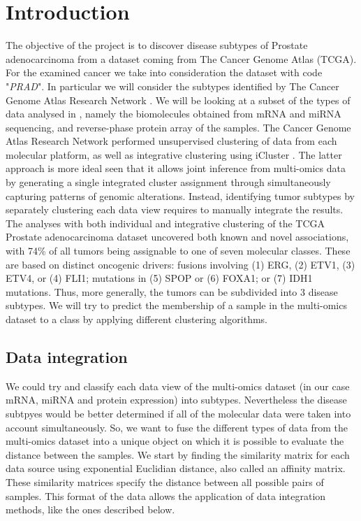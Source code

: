 \chapter{Introduction}
The objective of the project is to discover disease subtypes of Prostate adenocarcinoma from a dataset coming from The Cancer Genome Atlas (TCGA)\cite{hutter2018TCGA}. For the examined cancer we take into consideration the dataset with code "\textit{PRAD}". In particular we will consider the subtypes identified by The Cancer Genome Atlas Research Network \cite{abeshouse2015molecularPRAD}. We will be looking at a subset of the types of data analysed in \cite{abeshouse2015molecularPRAD}, namely the biomolecules  obtained from mRNA and miRNA sequencing, and reverse-phase protein array of the samples. The Cancer Genome Atlas Research Network performed unsupervised
clustering of data from each molecular platform, as well as integrative clustering using iCluster \cite{shen2009integrative}. The latter approach is more ideal seen that it allows joint inference from multi-omics data by generating a single integrated cluster assignment through simultaneously capturing patterns of genomic alterations. Instead, identifying tumor subtypes by separately clustering each data view requires to manually integrate the results.
The analyses with both individual and integrative clustering of the TCGA Prostate adenocarcinoma dataset uncovered both known and novel associations, with 74\% of all tumors being assignable to one of seven molecular classes. These are based on distinct oncogenic drivers: fusions involving (1) ERG, (2) ETV1, (3) ETV4, or (4) FLI1; mutations in (5) SPOP
or (6) FOXA1; or (7) IDH1 mutations. Thus, more generally, the tumors can be subdivided into 3 disease subtypes. We will try to predict the membership of a sample in the multi-omics dataset to a class by applying different clustering algorithms.

\section{Data integration}
We could try and classify each data view of the multi-omics dataset (in our case mRNA, miRNA and protein expression) into subtypes. Nevertheless the disease subtpyes would be better determined if all of the molecular data were taken into account simultaneously. So, we want to fuse the different types of data from the multi-omics dataset into a unique object on which it is possible to evaluate the distance between the samples. We start by finding the similarity matrix for each data source using exponential Euclidian distance, also called an affinity matrix. These similarity matrices specify the distance between all possible pairs of samples. This format of the data allows the application of data integration methods, like the ones described below.

